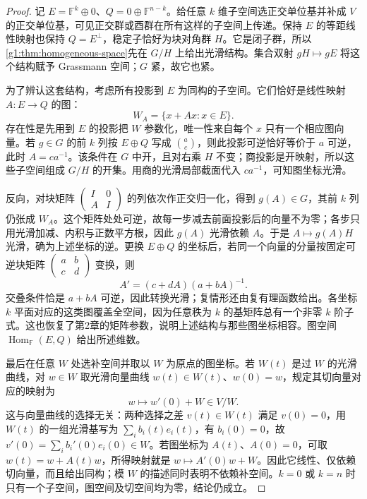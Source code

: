 \begin{proof}
	记 \(E=\mathbb F^k\oplus0\)、\(Q=0\oplus\mathbb F^{n-k}\)。给任意 \(k\) 维子空间选正交单位基并补成 \(V\) 的正交单位基，可见正交群或酉群在所有这样的子空间上传递。保持 \(E\) 的等距线性映射也保持 \(Q=E^\perp\)，稳定子恰好为块对角群 \(H\)。它是闭子群，所以\cref{g1:thm:homogeneous-space}先在 \(G/H\) 上给出光滑结构。集合双射 \(gH\mapsto gE\) 将这个结构赋予 Grassmann 空间；\(G\) 紧，故它也紧。

	为了辨认这套结构，考虑所有投影到 \(E\) 为同构的子空间。它们恰好是线性映射 \(A:E\to Q\) 的图：
	\begin{equation}\label{g1:eq:grassmann-graph-chart}
		W_A=\{x+Ax:x\in E\}.
	\end{equation}
	存在性是先用到 \(E\) 的投影把 \(W\) 参数化，唯一性来自每个 \(x\) 只有一个相应图向量。若 \(g\in G\) 的前 \(k\) 列按 \(E\oplus Q\) 写成 \(\binom{a}{c}\)，则此投影可逆恰好等价于 \(a\) 可逆，此时 \(A=ca^{-1}\)。该条件在 \(G\) 中开，且对右乘 \(H\) 不变；商投影是开映射，所以这些子空间组成 \(G/H\) 的开集。用商的光滑局部截面代入 \(ca^{-1}\)，可知图坐标光滑。

	反向，对块矩阵 \(\left(\begin{smallmatrix}I&0\\A&I\end{smallmatrix}\right)\) 的列依次作正交归一化，得到 \(g(A)\in G\)，其前 \(k\) 列仍张成 \(W_A\)。这个矩阵处处可逆，故每一步减去前面投影后的向量不为零；各步只用光滑加减、内积与正数平方根，因此 \(g(A)\) 光滑依赖 \(A\)。于是 \(A\mapsto g(A)H\) 光滑，确为上述坐标的逆。更换 \(E\oplus Q\) 的坐标后，若同一个向量的分量按固定可逆块矩阵 \(\left(\begin{smallmatrix}a&b\\c&d\end{smallmatrix}\right)\) 变换，则
	\begin{equation}\label{g1:eq:grassmann-chart-transition}
		A'=(c+dA)(a+bA)^{-1}.
	\end{equation}
	交叠条件恰是 \(a+bA\) 可逆，因此转换光滑；复情形还由复有理函数给出。各坐标 \(k\) 平面对应的这类图覆盖全空间，因为任意秩为 \(k\) 的基矩阵总有一个非零 \(k\) 阶子式。这也恢复了第2章的矩阵参数，说明上述结构与那些图坐标相容。图空间 \(\operatorname{Hom}_{\mathbb F}(E,Q)\) 给出所述维数。

	最后在任意 \(W\) 处选补空间并取以 \(W\) 为原点的图坐标。若 \(W(t)\) 是过 \(W\) 的光滑曲线，对 \(w\in W\) 取光滑向量曲线 \(w(t)\in W(t)\)、\(w(0)=w\)，规定其切向量对应的映射为
	\[
		w\longmapsto w'(0)+W\in V/W.
	\]
	这与向量曲线的选择无关：两种选择之差 \(v(t)\in W(t)\) 满足 \(v(0)=0\)，用 \(W(t)\) 的一组光滑基写为 \(\sum_i b_i(t)e_i(t)\)，有 \(b_i(0)=0\)，故 \(v'(0)=\sum_i b_i'(0)e_i(0)\in W\)。若图坐标为 \(A(t)\)、\(A(0)=0\)，可取 \(w(t)=w+A(t)w\)，所得映射就是 \(w\mapsto A'(0)w+W\)。因此它线性、仅依赖切向量，而且给出同构；模 \(W\) 的描述同时表明不依赖补空间。\(k=0\) 或 \(k=n\) 时只有一个子空间，图空间及切空间均为零，结论仍成立。
\end{proof}


